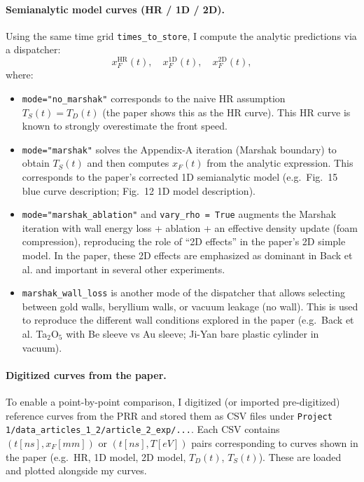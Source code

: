 \documentclass{article}
\begin{document}
\paragraph{Semianalytic model curves (HR / 1D / 2D).}
Using the same time grid \texttt{times\_to\_store}, I compute the analytic predictions via a dispatcher:
\[
x_F^{\mathrm{HR}}(t),\quad x_F^{\mathrm{1D}}(t),\quad x_F^{\mathrm{2D}}(t),
\]
where:
\begin{itemize}
    \item \texttt{mode="no\_marshak"} corresponds to the naive HR assumption $T_S(t)=T_D(t)$ (the paper shows this as the HR curve). This HR curve is known to strongly overestimate the front speed.
    \item \texttt{mode="marshak"} solves the Appendix-A iteration (Marshak boundary) to obtain $T_S(t)$ and then computes $x_F(t)$ from the analytic expression. This corresponds to the paper's corrected 1D semianalytic model (e.g.\ Fig.~15 blue curve description; Fig.~12 1D model description).
    \item \texttt{mode="marshak\_ablation"} and \texttt{vary\_rho = True} augments the Marshak iteration with wall energy loss + ablation + an effective density update (foam compression), reproducing the role of ``2D effects'' in the paper's 2D simple model. In the paper, these 2D effects are emphasized as dominant in Back et al. and important in several other experiments.
    \item \texttt{marshak\_wall\_loss} is another mode of the dispatcher that allows selecting between gold walls, beryllium walls, or vacuum leakage (no wall). This is used to reproduce the different wall conditions explored in the paper (e.g.\ Back et al. Ta$_2$O$_5$ with Be sleeve vs Au sleeve; Ji-Yan bare plastic cylinder in vacuum).
\end{itemize}

\paragraph{Digitized curves from the paper.}
To enable a point-by-point comparison, I digitized (or imported pre-digitized) reference curves from the PRR and stored them as CSV files under
\texttt{Project 1/data\_articles\_1\_2/article\_2\_exp/...}.
Each CSV contains $(t [ns], x_F [mm])$ or $(t [ns], T [eV])$ pairs corresponding to curves shown in the paper (e.g.\ HR, 1D model, 2D model, $T_D(t)$, $T_S(t)$). These are loaded and plotted alongside my curves.
\end{document}
